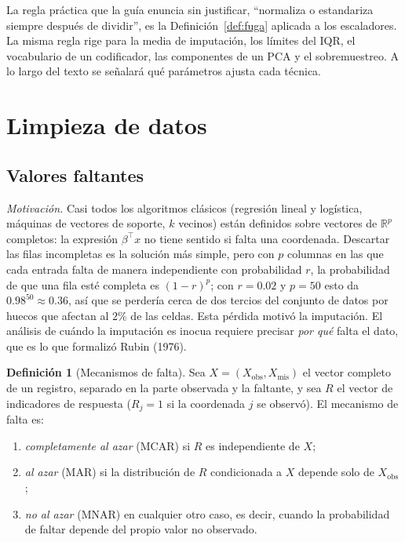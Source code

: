 \documentclass[11pt]{article}
\theoremstyle{definition}
\newtheorem{definicion}[teorema]{Definición}
\theoremstyle{remark}
\newcommand{\R}{\mathbb{R}}
\begin{document}
\noindent La regla práctica que la guía enuncia sin justificar, ``normaliza o estandariza siempre después de dividir'', es la Definición~\ref{def:fuga} aplicada a los escaladores. La misma regla rige para la media de imputación, los límites del IQR, el vocabulario de un codificador, las componentes de un PCA y el sobremuestreo. A lo largo del texto se señalará qué parámetros ajusta cada técnica.

\section{Limpieza de datos}\label{sec:limpieza}

\subsection{Valores faltantes}\label{sec:faltantes}

\noindent \emph{Motivación.} Casi todos los algoritmos clásicos (regresión lineal y logística, máquinas de vectores de soporte, $k$ vecinos) están definidos sobre vectores de $\R^p$ completos: la expresión $\beta^\top x$ no tiene sentido si falta una coordenada. Descartar las filas incompletas es la solución más simple, pero con $p$ columnas en las que cada entrada falta de manera independiente con probabilidad $r$, la probabilidad de que una fila esté completa es $(1-r)^p$; con $r=0.02$ y $p=50$ esto da $0.98^{50}\approx 0.36$, así que se perdería cerca de dos tercios del conjunto de datos por huecos que afectan al $2\%$ de las celdas. Esta pérdida motivó la imputación. El análisis de cuándo la imputación es inocua requiere precisar \emph{por qué} falta el dato, que es lo que formalizó Rubin (1976).

\begin{definicion}[Mecanismos de falta]\label{def:mcar}
\noindent Sea $X=(X_{\mathrm{obs}},X_{\mathrm{mis}})$ el vector completo de un registro, separado en la parte observada y la faltante, y sea $R$ el vector de indicadores de respuesta ($R_j=1$ si la coordenada $j$ se observó). El mecanismo de falta es:
\begin{enumerate}[label=(\alph*)]
\item \emph{completamente al azar} (MCAR) si $R$ es independiente de $X$;
\item \emph{al azar} (MAR) si la distribución de $R$ condicionada a $X$ depende solo de $X_{\mathrm{obs}}$;
\item \emph{no al azar} (MNAR) en cualquier otro caso, es decir, cuando la probabilidad de faltar depende del propio valor no observado.
\end{enumerate}
\end{definicion}
\end{document}
